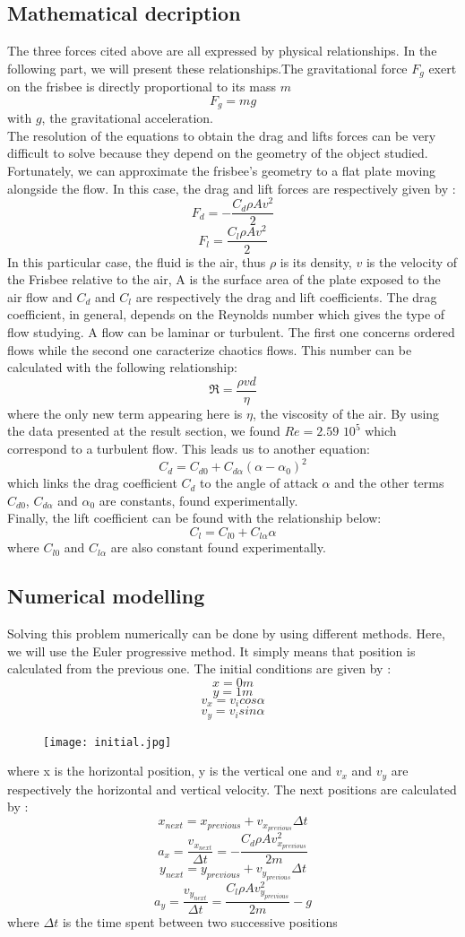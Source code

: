 \documentclass[10pt,a4paper]{report}
\begin{document}
\subsection{Mathematical decription}
The three forces cited above are all expressed by physical relationships. In the following part, we will present these relationships.The gravitational force $F_g$ exert on the frisbee is directly proportional to its mass $m$
\[F_g = m g\]
with $g$, the gravitational acceleration.
\\
The resolution of the equations to obtain the drag and lifts forces can be very difficult to solve because they depend on the geometry of the object studied. Fortunately, we can approximate the frisbee's geometry to a flat plate moving alongside the flow. In this case, the drag and lift forces are respectively given by :
\[F_d = -\frac{C_d \rho A  v^2}{2}\]
\[F_l = \frac{C_l \rho A  v^2}{2}\]
In this particular case, the fluid is the air, thus $\rho$ is its density, $v$ is the velocity of the Frisbee relative to the air, A is the surface area of the plate exposed to the air flow and $C_d$ and $C_l$ are respectively the drag and lift coefficients.
The drag coefficient, in general, depends on the Reynolds number which gives the type of flow studying. A flow can be laminar or turbulent. The first one concerns ordered flows while the second one caracterize chaotics flows. This number can be calculated with the following relationship:
\[\Re = \frac{\rho v d}{\eta}\]
where the only new term appearing here is $\eta$, the viscosity of the air.
By using the data presented at the result section, we found $Re=2.59$ $10^5$ which correspond to a turbulent flow.
This leads us to another equation:
\[C_d = C_{d0} + C_{d\alpha}(\alpha-\alpha_0)^2\]
which links the drag coefficient $C_d$ to the angle of attack $\alpha$ and the other terms $C_{d0}$, $C_{d\alpha}$ and $\alpha_0$ are constants, found experimentally.
\\Finally, the lift coefficient can be found with the relationship below:
\[C_l = C_{l0} + C_{l \alpha} \alpha\]
where $C_{l0}$ and $C_{l\alpha}$ are also constant found experimentally.
\subsection{Numerical modelling}
Solving this problem numerically can be done by using different methods. Here, we will use the Euler progressive method. It simply means that position is calculated from the previous one.
The initial conditions are given by :
\[x = 0 m\]
\[y = 1 m\]
\[v_x = v_i cos\alpha \]
\[v_y = v_i sin\alpha \] 
\begin{figure}[h]
\centering
\texttt{[image: initial.jpg]}
\end{figure}
where x is the horizontal position, y is the vertical one and $v_x$ and $v_y$ are respectively the horizontal and vertical velocity.
The next positions are calculated by :
\[x_{next} = x_{previous} + v_{x_{previous}} \Delta t \]
\[a_x=\frac{v_{x_{next}}}{\Delta t} = -\frac{C_d \rho A  v_{x_{previous}}^2}{2m}\]
\[y_{next} = y_{previous} + v_{y_{previous}} \Delta t \]
\[a_y = \frac{v_{y_{next}}}{\Delta t} = \frac{C_l \rho A  v_{y_{previous}}^2}{2m} - g\]
where $\Delta t$ is the time spent between two successive positions
\end{document}
